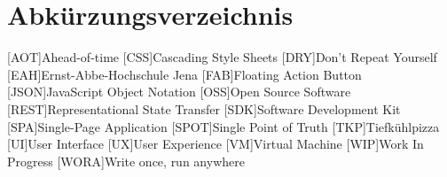 \section*{Abkürzungsverzeichnis}
\begin{acronym}[xxxxxxx]\itemsep0pt
    [AOT]{Ahead-of-time}
    [CSS]{Cascading Style Sheets}
    [DRY]{Don’t Repeat Yourself}
    [EAH]{Ernst-Abbe-Hochschule Jena}
    [FAB]{Floating Action Button}
    [JSON]{JavaScript Object Notation}
    [OSS]{Open Source Software}
    [REST]{Representational State Transfer}
    [SDK]{Software Development Kit }
    [SPA]{Single-Page Application}
    [SPOT]{Single Point of Truth}
    [TKP]{Tiefkühlpizza}
    [UI]{User Interface}
    [UX]{User Experience}
    [VM]{Virtual Machine}
    [WIP]{Work In Progress}
    [WORA]{Write once, run anywhere}
\end{acronym}
